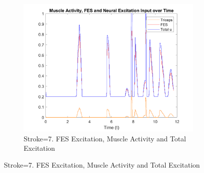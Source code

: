 \begin{landscape}
\begin{figure}[ht]
        \begin{subfigure}[b]{0.33\textwidth}
            \centering
            \includegraphics[width=\linewidth]{Pictures/Results/Controller/Stroke7/20_fes.png}
            \caption{Stroke=7. FES Excitation, Muscle Activity and Total Excitation}
        \end{subfigure}
        
        \vspace{2pt}


\end{figure}
\end{landscape}
